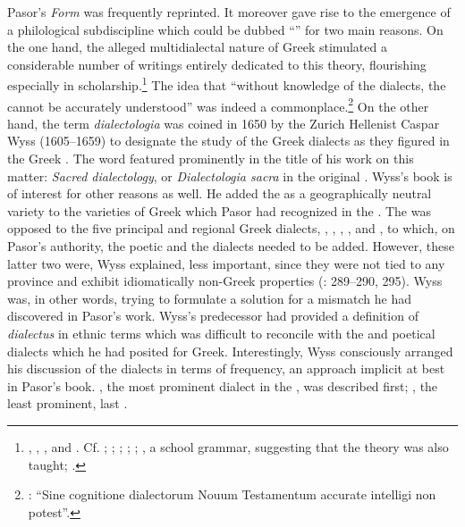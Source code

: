 Pasor’s \textit{Form} was frequently reprinted. It moreover gave rise to the emergence of a philological subdiscipline which could be dubbed “” for two main reasons. On the one hand, the alleged multidialectal nature of  Greek stimulated a considerable number of writings entirely dedicated to this theory, flourishing especially in  scholarship.\footnote{\citet{Wyss1650}, \citet{Olearius1668}, \citet{Leusden1670}, and \citet{Nibbe1755}. Cf. \citet[347]{Parr1686}; \citet[18--19]{Von1705}; \citet[9--10]{Florinus1707}; \citet[\textsc{d.2}\textsc{\textsuperscript{r}}, \textsc{d.5}\textsc{\textsuperscript{v}}]{Thryllitsch1709}; \citet[18]{Reinhard1724}; \citet[121--122]{Holmes1735}, a school grammar, suggesting that the theory was also taught; \citet[136--137]{Walch1772}.} The idea that “without knowledge of the dialects, the  cannot be accurately understood” was indeed a commonplace.\footnote{\citet[\textsc{d.5}\textsc{\textsuperscript{v}}]{Thryllitsch1709}: “Sine cognitione dialectorum Nouum Testamentum accurate intelligi non potest”.} On the other hand, the term \textit{dialectologia} was coined in 1650 by the Zurich Hellenist Caspar Wyss (1605–1659) to designate the study of the Greek dialects as they figured in the Greek . The word featured prominently in the title of his work on this matter: \textit{Sacred dialectology}, or \textit{Dialectologia sacra} in the original . Wyss’s book is of interest for other reasons as well. He added the  as a geographically neutral variety to the varieties of Greek which Pasor had recognized in the  \citep[3]{Wyss1650}. The  was opposed to the five principal and regional Greek dialects, , , , , and , to which, on Pasor’s authority, the poetic and the  dialects needed to be added. However, these latter two were, Wyss explained, less important, since they were not tied to any province and exhibit idiomatically non-Greek properties (\citealt{Wyss1650}: 289–290, 295). Wyss was, in other words, trying to formulate a solution for a mismatch he had discovered in Pasor’s work. Wyss’s predecessor had provided a definition of \textit{dialectus} in ethnic terms which was difficult to reconcile with the  and poetical dialects which he had posited for  Greek. Interestingly, Wyss consciously arranged his discussion of the  dialects in terms of frequency, an approach implicit at best in Pasor’s book. , the most prominent dialect in the , was described first; , the least prominent, last \citep[4]{Wyss1650}.

